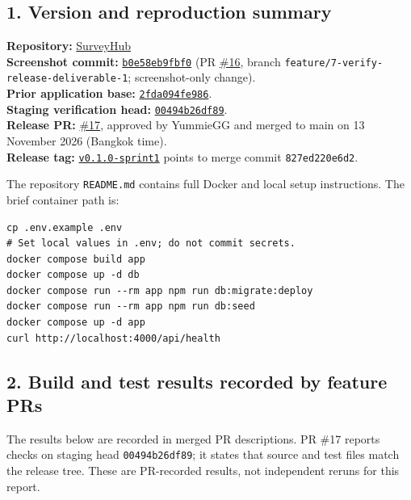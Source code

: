 \documentclass[12pt,a4paper]{article}
\begin{document}
\subsection*{1. Version and reproduction summary}
\textbf{Repository:} \href{https://github.com/Snnn3/SurveyHub}{SurveyHub}\\
\textbf{Screenshot commit:} \href{https://github.com/Snnn3/SurveyHub/commit/b0e58eb9fbf066bc56ef5197ea5d39174f6afe76}{\texttt{b0e58eb9fbf0}} (PR \href{https://github.com/Snnn3/SurveyHub/pull/16}{\#16}, branch \texttt{feature/7-verify-release-deliverable-1}; screenshot-only change).\\\textbf{Prior application base:} \href{https://github.com/Snnn3/SurveyHub/commit/2fda094fe9867a701228f2412fcb37e8f9454d52}{\texttt{2fda094fe986}}.\\\textbf{Staging verification head:} \href{https://github.com/Snnn3/SurveyHub/commit/00494b26df89892066c2680e0a03e0cc03c905a7}{\texttt{00494b26df89}}.\\\textbf{Release PR:} \href{https://github.com/Snnn3/SurveyHub/pull/17}{\#17}, approved by YummieGG and merged to main on 13 November 2026 (Bangkok time).\\\textbf{Release tag:} \href{https://github.com/Snnn3/SurveyHub/commit/827ed220e6d2290193df7d5234ed3b757ec38988}{\texttt{v0.1.0-sprint1}} points to merge commit \texttt{827ed220e6d2}.

The repository \texttt{README.md} contains full Docker and local setup instructions. The brief container path is:

\begin{lstlisting}
cp .env.example .env
# Set local values in .env; do not commit secrets.
docker compose build app
docker compose up -d db
docker compose run --rm app npm run db:migrate:deploy
docker compose run --rm app npm run db:seed
docker compose up -d app
curl http://localhost:4000/api/health
\end{lstlisting}

\subsection*{2. Build and test results recorded by feature PRs}
The results below are recorded in merged PR descriptions. PR \#17 reports checks on staging head \texttt{00494b26df89}; it states that source and test files match the release tree. These are PR-recorded results, not independent reruns for this report.
\end{document}
